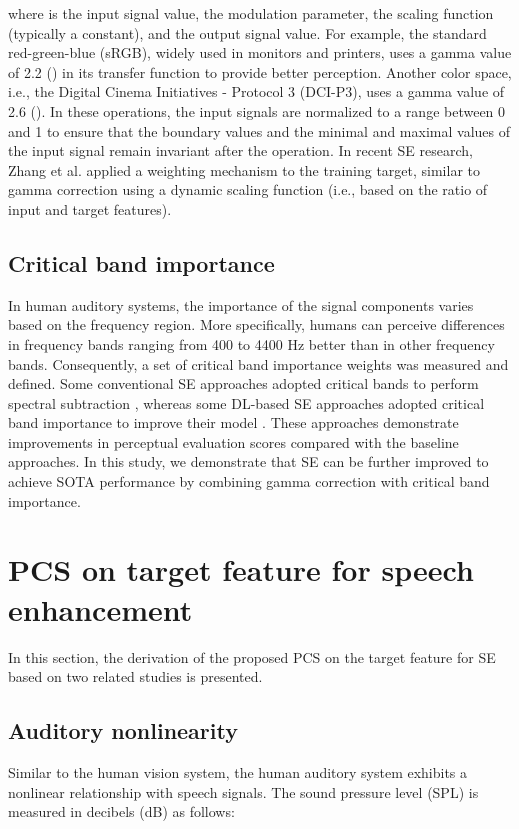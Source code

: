 \documentclass[a4paper]{article}
\begin{document}
where  is the input signal value,  the modulation parameter,  the scaling function (typically a constant), and  the output signal value. For example, the standard red-green-blue (sRGB), widely used in monitors and printers, uses a gamma value of 2.2 () in its transfer function to provide better perception. Another color space, i.e., the Digital Cinema Initiatives - Protocol 3 (DCI-P3), uses a gamma value of 2.6 (). In these operations, the input signals are normalized to a range between 0 and 1 to ensure that the boundary values and the minimal and maximal values of the input signal remain invariant after the operation. In recent SE research, Zhang et al. \cite{zhang2021low} applied a weighting mechanism to the training target, similar to gamma correction using a dynamic scaling function (i.e., based on the ratio of input and target features).  





\subsection{Critical band importance}
\label{ssec:criticalband}
In human auditory systems, the importance of the signal components varies based on the frequency region. More specifically, humans can perceive differences in frequency bands ranging from 400 to 4400 Hz better than in other frequency bands. Consequently, a set of critical band importance weights was measured and defined. Some conventional SE approaches adopted critical bands to perform spectral subtraction \cite{singh1998speech}, whereas some DL-based SE approaches adopted critical band importance to improve their model \cite{liu2018bone}. These approaches demonstrate improvements in perceptual evaluation scores compared with the baseline approaches. In this study, we demonstrate that SE can be further improved to achieve SOTA performance by combining gamma correction with critical band importance.

\section{PCS on target feature for speech enhancement}
In this section, the derivation of the proposed PCS on the target feature for SE based on two related studies is presented.

\subsection{Auditory nonlinearity}
Similar to the human vision system, the human auditory system exhibits a nonlinear relationship with speech signals. The sound pressure level (SPL) is measured in decibels (dB) as follows:
\end{document}
